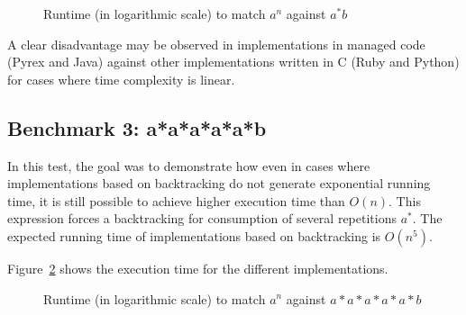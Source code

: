 \documentclass{llncs}
\begin{document}
\begin{figure}[!htbp]
\centering
{}
\caption{Runtime (in logarithmic scale) to match $a^n$ against $a^*b$}
\label{fig:graph_bench_2}
\end{figure}

A clear disadvantage may be observed in implementations in managed code (Pyrex and Java) against other implementations written in C (Ruby and Python) for cases where time complexity is linear.


\subsection{Benchmark 3: a*a*a*a*a*b}

In this test, the goal was to demonstrate how even in cases where implementations based on backtracking do not generate exponential running time, it is still possible to achieve higher execution time than $O(n)$. This expression forces a backtracking for consumption of several repetitions $a^*$. The expected running time of implementations based on backtracking is $O(n^5)$. 

Figure~\ref{fig:graph_bench_3} shows the execution time for the different implementations.

\begin{figure}[!htbp]
\centering
{}
\caption{Runtime (in logarithmic scale) to match $a^n$ against $a*a*a*a*a*b$}
\label{fig:graph_bench_3}
\end{figure}
\end{document}
